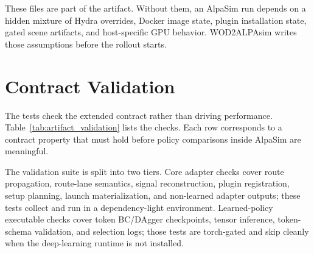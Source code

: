 \documentclass{article}
\begin{document}
These files are part of the artifact. Without them, an AlpaSim run depends on a hidden
mixture of Hydra overrides, Docker image state, plugin installation state, gated scene
artifacts, and host-specific GPU behavior. WOD2ALPAsim writes those assumptions before
the rollout starts.

\section{Contract Validation}

The tests check the extended contract rather than driving performance.
Table~\ref{tab:artifact_validation} lists the checks. Each row corresponds to a contract
property that must hold before policy comparisons inside AlpaSim are meaningful.

The validation suite is split into two tiers. Core adapter checks
cover route propagation, route-lane semantics, signal reconstruction, plugin
registration, setup planning, launch materialization, and non-learned adapter outputs;
these tests collect and run in a dependency-light environment. Learned-policy executable
checks cover token BC/DAgger checkpoints, tensor inference, token-schema validation, and
selection logs; those tests are torch-gated and skip cleanly when the deep-learning
runtime is not installed.
\end{document}
